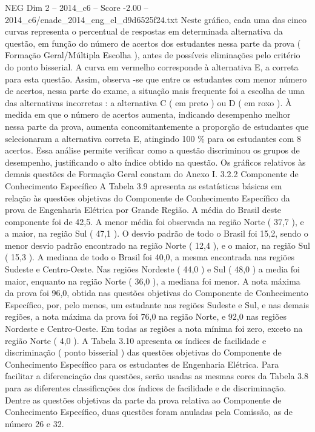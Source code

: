 \begin{textsample}{NEG Dim 2 – 2014\_c6 – Score -2.00 – 2014\_c6/enade\_2014\_eng\_el\_d9d6525f24.txt}
Neste gráfico, cada uma das cinco curvas representa o percentual de respostas em determinada alternativa da questão, em função do número de acertos dos estudantes nessa parte da prova ( Formação Geral/Múltipla Escolha ), antes de possíveis eliminações pelo critério do ponto bisserial.
A curva em vermelho corresponde à alternativa E, a correta para esta questão.
Assim, observa -se que entre os estudantes com menor número de acertos, nessa parte do exame, a situação mais frequente foi a escolha de uma das alternativas incorretas : a alternativa C ( em preto ) ou D ( em roxo ).
À medida em que o número de acertos aumenta, indicando desempenho melhor nessa parte da prova, aumenta concomitantemente a proporção de estudantes que selecionaram a alternativa correta E, atingindo 100 \% para os estudantes com 8 acertos.
Essa análise permite verificar como a questão discriminou os grupos de desempenho, justificando o alto índice obtido na questão.
Os gráficos relativos às demais questões de Formação Geral constam do Anexo I. 3.2.2 Componente de Conhecimento Específico A Tabela 3.9 apresenta as estatísticas básicas em relação às questões objetivas do Componente de Conhecimento Específico da prova de Engenharia Elétrica por Grande Região.
A média do Brasil deste componente foi de 42,5.
A menor média foi observada na região Norte ( 37,7 ), e a maior, na região Sul ( 47,1 ).
O desvio padrão de todo o Brasil foi 15,2, sendo o menor desvio padrão encontrado na região Norte ( 12,4 ), e o maior, na região Sul ( 15,3 ).
A mediana de todo o Brasil foi 40,0, a mesma encontrada nas regiões Sudeste e Centro-Oeste.
Nas regiões Nordeste ( 44,0 ) e Sul ( 48,0 ) a media foi maior, enquanto na região Norte ( 36,0 ), a mediana foi menor.
A nota máxima da prova foi 96,0, obtida nas questões objetivas do Componente de Conhecimento Específico, por, pelo menos, um estudante nas regiões Sudeste e Sul, e nas demais regiões, a nota máxima da prova foi 76,0 na região Norte, e 92,0 nas regiões Nordeste e Centro-Oeste.
Em todas as regiões a nota mínima foi zero, exceto na região Norte ( 4,0 ).
A Tabela 3.10 apresenta os índices de facilidade e discriminação ( ponto bisserial ) das questões objetivas do Componente de Conhecimento Específico para os estudantes de Engenharia Elétrica.
Para facilitar a diferenciação das questões, serão usadas as mesmas cores da Tabela 3.8 para as diferentes classificações dos índices de facilidade e de discriminação.
Dentre as questões objetivas da parte da prova relativa ao Componente de Conhecimento Específico, duas questões foram anuladas pela Comissão, as de número 26 e 32.

\end{textsample}
